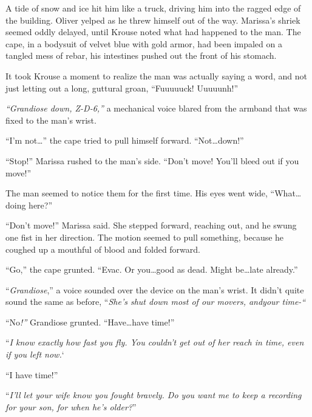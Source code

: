 A tide of snow and ice hit him like a truck, driving him into the ragged edge of the building.  Oliver yelped as he threw himself out of the way.  Marissa's shriek seemed oddly delayed, until Krouse noted what had happened to the man.  The cape, in a bodysuit of velvet blue with gold armor, had been impaled on a tangled mess of rebar, his intestines pushed out the front of his stomach.



It took Krouse a moment to realize the man was actually saying a word, and not just letting out a long, guttural groan, ``Fuuuuuck!  Uuuuunh!''



\emph{``Grandiose down, Z-D-6,''} a mechanical voice blared from the armband that was fixed to the man's wrist.



``I'm not\ldots'' the cape tried to pull himself forward.  ``Not\ldots down!''



``Stop!''  Marissa rushed to the man's side.  ``Don't move!  You'll bleed out if you move!''



The man seemed to notice them for the first time.  His eyes went wide, ``What\ldots doing here?''



``Don't move!'' Marissa said.  She stepped forward, reaching out, and he swung one fist in her direction.  The motion seemed to pull something, because he coughed up a mouthful of blood and folded forward.



``Go,'' the cape grunted.  ``Evac.  Or you\ldots good as dead.  Might be\ldots late already.''



``\emph{Grandiose},'' a voice sounded over the device on the man's wrist.  It didn't quite sound the same as before, ``\emph{She's shut down most of our movers, and}\emph{your time-``}



``No\emph{!''} Grandiose grunted.  ``Have\ldots have time!''



``\emph{I know exactly how fast you fly.  You couldn't get out of her reach in time, even if you left now.}`



``I have time!''



``\emph{I'll let your wife know you fought bravely.  Do you want me to keep a recording for your son, for when he's older?}''



